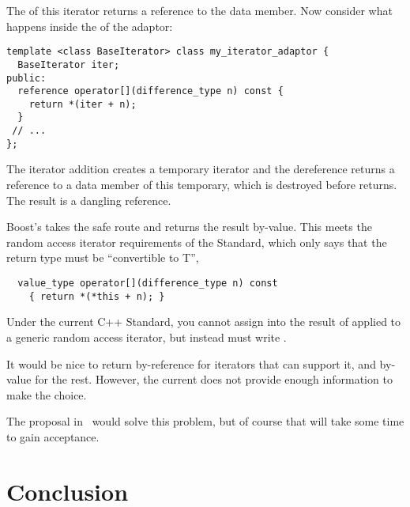\documentclass{netobjectdays}
\begin{document}
\noindent The  of this iterator returns a reference to
the data member. Now consider what happens inside the
 of the adaptor:

{\footnotesize
\begin{verbatim}
template <class BaseIterator> class my_iterator_adaptor {
  BaseIterator iter;
public:
  reference operator[](difference_type n) const {
    return *(iter + n);
  }
 // ...
};
\end{verbatim}
}

\noindent The iterator addition creates a temporary iterator and the
dereference returns a reference to a data member of this temporary,
which is destroyed before  returns. The result is a
dangling reference.

Boost's  takes the safe route and returns the
result by-value. This meets the random access iterator requirements of
the Standard, which only says that the return type must be
``convertible to T'',

{\footnotesize
\begin{verbatim}
  value_type operator[](difference_type n) const
    { return *(*this + n); }
\end{verbatim}
}

Under the current {C++} Standard, you cannot assign into the result of
 applied to a generic random access iterator,
but instead must write .

It would be nice to return by-reference for iterators that can support
it, and by-value for the rest. However, the current
 does not provide enough information to make the
choice.



The proposal in~\cite{siek01:_improved_iter_cat} would solve this
problem, but of course that will take some time to gain acceptance.


\section{Conclusion}
\end{document}
